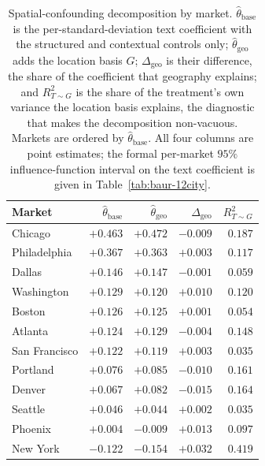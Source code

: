\begin{table}[H]
\centering
\caption{Spatial-confounding decomposition by market. $\hat\theta_{\text{base}}$ is the per-standard-deviation text coefficient with the structured and contextual controls only; $\hat\theta_{\text{geo}}$ adds the location basis $G$; $\Delta_{\text{geo}}$ is their difference, the share of the coefficient that geography explains; and $R^2_{T\sim G}$ is the share of the treatment's own variance the location basis explains, the diagnostic that makes the decomposition non-vacuous. Markets are ordered by $\hat\theta_{\text{base}}$. All four columns are point estimates; the formal per-market $95\%$ influence-function interval on the text coefficient is given in Table~\ref{tab:baur-12city}.}
\label{tab:decomposition-12}
\small
\begin{tabular}{lrrrr}
\toprule
Market & $\hat\theta_{\text{base}}$ & $\hat\theta_{\text{geo}}$ & $\Delta_{\text{geo}}$ & $R^2_{T\sim G}$ \\
\midrule
Chicago       & $+0.463$ & $+0.472$ & $-0.009$ & $0.187$ \\
Philadelphia  & $+0.367$ & $+0.363$ & $+0.003$ & $0.117$ \\
Dallas        & $+0.146$ & $+0.147$ & $-0.001$ & $0.059$ \\
Washington    & $+0.129$ & $+0.120$ & $+0.010$ & $0.120$ \\
Boston        & $+0.126$ & $+0.125$ & $+0.001$ & $0.054$ \\
Atlanta       & $+0.124$ & $+0.129$ & $-0.004$ & $0.148$ \\
San Francisco & $+0.122$ & $+0.119$ & $+0.003$ & $0.035$ \\
Portland      & $+0.076$ & $+0.085$ & $-0.010$ & $0.161$ \\
Denver        & $+0.067$ & $+0.082$ & $-0.015$ & $0.164$ \\
Seattle       & $+0.046$ & $+0.044$ & $+0.002$ & $0.035$ \\
Phoenix       & $+0.004$ & $-0.009$ & $+0.013$ & $0.097$ \\
New York      & $-0.122$ & $-0.154$ & $+0.032$ & $0.419$ \\
\bottomrule
\end{tabular}
\end{table}

